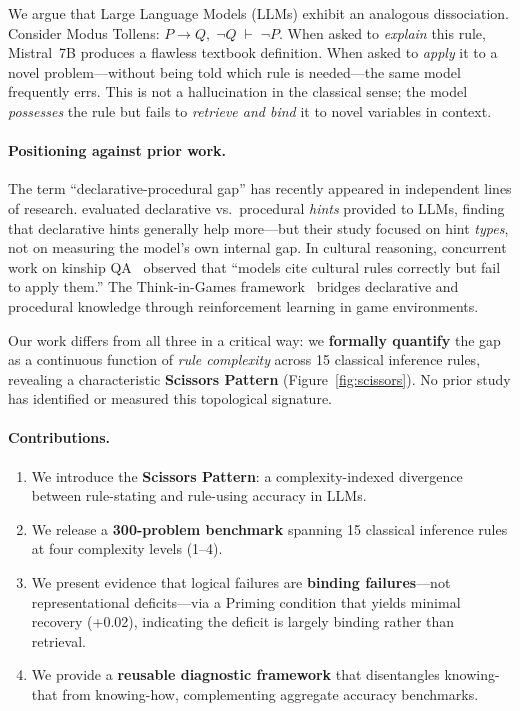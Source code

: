 \documentclass[11pt]{article}
\begin{document}
We argue that Large Language Models (LLMs) exhibit an analogous
dissociation.
Consider Modus Tollens: $P \to Q,\; \neg Q \;\vdash\; \neg P$.
When asked to \emph{explain} this rule, Mistral~7B produces a
flawless textbook definition.
When asked to \emph{apply} it to a novel problem---without being told
which rule is needed---the same model frequently errs.
This is not a hallucination in the classical sense; the model
\emph{possesses} the rule but fails to \emph{retrieve and bind} it
to novel variables in context.

\paragraph{Positioning against prior work.}
The term ``declarative-procedural gap'' has recently appeared in
independent lines of research.
\citet{li2024metacognitive} evaluated declarative vs.\ procedural
\emph{hints} provided to LLMs, finding that declarative hints
generally help more---but their study focused on hint \emph{types},
not on measuring the model's own internal gap.
In cultural reasoning, concurrent work on kinship
QA~\cite{kinshipqa2026} observed that ``models cite cultural rules
correctly but fail to apply them.''
The Think-in-Games framework~\cite{liao2025tig} bridges declarative
and procedural knowledge through reinforcement learning in game
environments.

Our work differs from all three in a critical way: we \textbf{formally
quantify} the gap as a continuous function of \emph{rule complexity}
across 15 classical inference rules, revealing a characteristic
\textbf{Scissors Pattern} (Figure~\ref{fig:scissors}).
No prior study has identified or measured this topological signature.

\paragraph{Contributions.}
\begin{enumerate}
    \item We introduce the \textbf{Scissors Pattern}: a
    complexity-indexed divergence between rule-stating and rule-using
    accuracy in LLMs.
    \item We release a \textbf{300-problem benchmark} spanning 15
    classical inference rules at four complexity levels (1--4).
    \item We present evidence that logical failures are
    \textbf{binding failures}---not representational deficits---via
    a Priming condition that yields minimal recovery (+0.02), indicating the deficit is largely binding rather than retrieval.
    \item We provide a \textbf{reusable diagnostic framework} that
    disentangles knowing-that from knowing-how, complementing
    aggregate accuracy benchmarks.
\end{enumerate}
\end{document}
